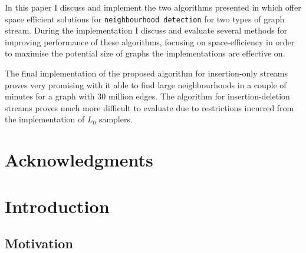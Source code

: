\documentclass[11pt,twoside,a4paper]{report}
\begin{document}
\par In this paper I discuss and implement the two algorithms presented in \cite{orig} which offer space efficient solutions for \texttt{neighbourhood detection} for two types of graph stream. During the implementation I discuss and evaluate several methods for improving performance of these algorithms, focusing on space-efficiency in order to maximise the potential size of graphs the implementations are effective on.

\par The final implementation of the proposed algorithm for insertion-only streams proves very promising with it able to find large neighbourhoods in a couple of minutes for a graph with 30 million edges. The algorithm for insertion-deletion streams proves much more difficult to evaluate due to restrictions incurred from the implementation of $L_0$ samplers.

\chapter*{Acknowledgments}

\renewcommand\thechapter{\Roman{chapter}}
\renewcommand\thesection{\thechapter.\roman{section}}
\renewcommand\thesubsection{\thesection.\roman{subsection}}
\setcounter{chapter}{1}
\chapter*{Introduction}

\section{Motivation}

\end{document}
